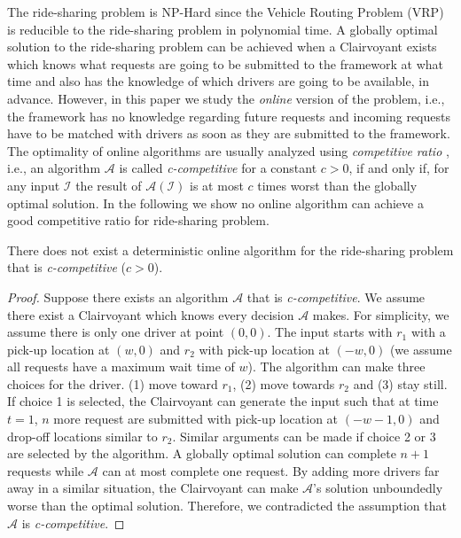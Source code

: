 The ride-sharing problem is NP-Hard since the Vehicle Routing Problem (VRP) \cite{Dantzig59} is reducible to the ride-sharing problem in polynomial time. A globally optimal solution to the ride-sharing problem can be achieved when a Clairvoyant exists which knows what requests are going to be submitted to the framework at what time and also has the knowledge of which drivers are going to be available, in advance. However, in this paper we study the \textit{online} version of the problem, i.e., the framework has no knowledge regarding future requests and incoming requests have to be matched with drivers as soon as they are submitted to the framework. The optimality of online algorithms are usually analyzed using \textit{competitive ratio} \cite{Sleator85}, i.e., an algorithm $\mathcal{A}$ is called \textit{c-competitive} for a constant $c > 0$, if and only if, for any input $\mathcal{I}$ the result of $\mathcal{A}(\mathcal{I})$ is at most $c$ times worst than the globally optimal solution. In the following we show no online algorithm can achieve a good competitive ratio for ride-sharing problem.

\begin{theorem}
\label{th:comp_ratio}
There does not exist a deterministic online algorithm for the ride-sharing problem that is \textit{c-competitive} ($c > 0$). 
\end{theorem}

\begin{proof}
Suppose there exists an algorithm $\mathcal{A}$ that is \textit{c-competitive}. We assume there exist a Clairvoyant which knows every decision $\mathcal{A}$ makes. For simplicity, we assume there is only one driver at point $(0, 0)$. The input starts with $r_1$ with a pick-up location at $(w, 0)$ and $r_2$ with pick-up location at $(-w, 0)$ (we assume all requests have a maximum wait time of $w$). The algorithm can make three choices for the driver. (1) move toward $r_1$, (2) move towards $r_2$ and (3) stay still. If choice 1 is selected, the Clairvoyant can generate the input such that at time $t = 1$, $n$ more request are submitted with pick-up location at $(-w-1, 0)$ and drop-off locations similar to $r_2$. Similar arguments can be made if choice 2 or 3 are selected by the algorithm. A globally optimal solution can complete $n+1$ requests while $\mathcal{A}$ can at most complete one request. By adding more drivers far away in a similar situation, the Clairvoyant can make $\mathcal{A}$'s solution unboundedly worse than the optimal solution. Therefore, we contradicted the assumption that $\mathcal{A}$ is \textit{c-competitive}.
\end{proof}



